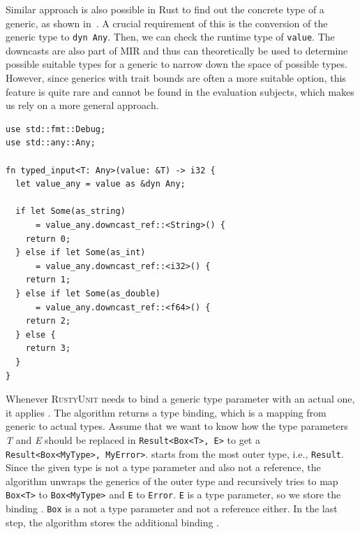 \documentclass[paper=a4,%
  twoside,%
  BCOR4mm,%
  abstract=true,%
  toc=bibliography,%
  chapterprefix=true,%
  toc=bibliographynumbered,%
  open=right,%
  english,%
  pagesize=pdftex]{scrreprt}
\newcommand{\tech}{\textsc{RustyUnit}\xspace}
\newcommand{\mir}{\ac{MIR}\xspace}
\begin{document}
Similar approach is also possible in Rust to find out the concrete type of a generic, as shown in~. A crucial requirement of this is the conversion of the generic type to \texttt{dyn Any}. Then, we can check the runtime type of \texttt{value}. The downcasts are also part of \mir and thus can theoretically be used to determine possible suitable types for a generic to narrow down the space of possible types. However, since generics with trait bounds are often a more suitable option, this feature is quite rare and cannot be found in the evaluation subjects, which makes us rely on a more general approach.

\begin{lstlisting}[style=boxed, caption={The execution path of the generic Rust function depends on the concrete type of the argument}, label=lst:rust-runtime-reflection]
use std::fmt::Debug;
use std::any::Any;

fn typed_input<T: Any>(value: &T) -> i32 {
  let value_any = value as &dyn Any;

  if let Some(as_string)
      = value_any.downcast_ref::<String>() {
    return 0;
  } else if let Some(as_int)
      = value_any.downcast_ref::<i32>() {
    return 1;
  } else if let Some(as_double)
      = value_any.downcast_ref::<f64>() {
    return 2;
  } else {
    return 3;
  }
}
\end{lstlisting}

Whenever \tech needs to bind a generic type parameter with an actual one, it applies . The algorithm returns a type binding, which is a mapping from generic to actual types. Assume that we want to know how the type parameters \emph{T} and \emph{E} should be replaced in \texttt{Result<Box<T>, E>} to get a \texttt{Result<Box<MyType>, MyError>}.  starts from the most outer type, i.e., \texttt{Result}. Since the given type is not a type parameter and also not a reference, the algorithm unwraps the generics of the outer type and recursively tries to map \texttt{Box<T>} to \texttt{Box<MyType>} and \texttt{E} to \texttt{Error}. \texttt{E} is a type parameter, so we store the binding \texttt{}. \texttt{Box} is a not a type parameter and not a reference either. In the last step, the algorithm stores the additional binding \texttt{}.
\end{document}
